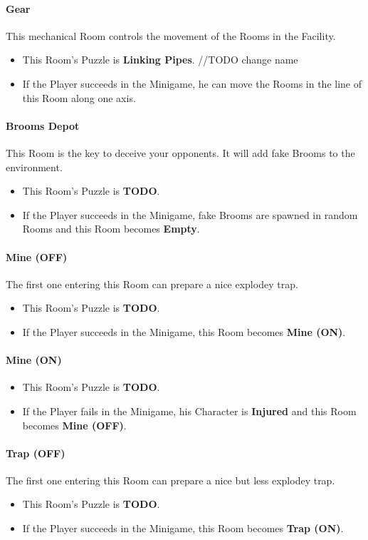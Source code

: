 \paragraph{Gear} This mechanical Room controls the movement of the Rooms in the Facility.
\begin{itemize}
	\item This Room's Puzzle is \textbf{Linking Pipes}. //TODO change name
	\item If the Player succeeds in the Minigame, he can move the Rooms in the line of this Room along one axis.
\end{itemize}

\paragraph{Brooms Depot} This Room is the key to deceive your opponents. It will add fake Brooms to the environment.
\begin{itemize}
	\item This Room's Puzzle is \textbf{TODO}.
	\item If the Player succeeds in the Minigame, fake Brooms are spawned in random Rooms and this Room becomes \textbf{Empty}.
\end{itemize}

\paragraph{Mine (OFF)} The first one entering this Room can prepare a nice explodey trap.
\begin{itemize}
	\item This Room's Puzzle is \textbf{TODO}.
	\item If the Player succeeds in the Minigame, this Room becomes \textbf{Mine (ON)}.
\end{itemize}

\paragraph{Mine (ON)}
\begin{itemize}
	\item This Room's Puzzle is \textbf{TODO}.
	\item If the Player fails    in the Minigame, his Character is \textbf{Injured} and this Room becomes \textbf{Mine (OFF)}.
\end{itemize}

\paragraph{Trap (OFF)} The first one entering this Room can prepare a nice but less explodey trap.
\begin{itemize}
	\item This Room's Puzzle is \textbf{TODO}.
	\item If the Player succeeds in the Minigame, this Room becomes \textbf{Trap (ON)}.
\end{itemize}

